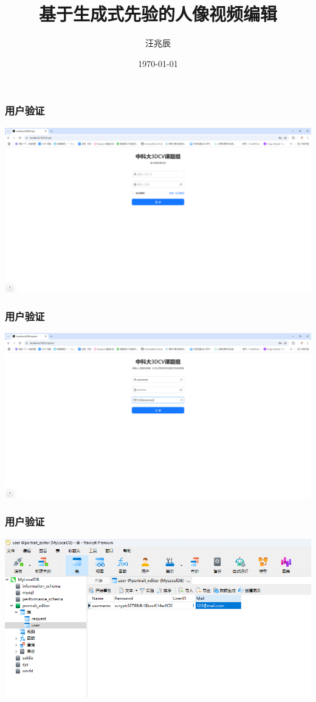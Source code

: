 \documentclass{beamer}
\title{基于生成式先验的人像视频编辑}
\author{汪兆辰}
\date{\ukdate\today}
\begin{document}
\begin{frame}
    \titlepage
\end{frame}

\begin{frame}
    \frametitle{用户验证}
    \includegraphics[width=\textwidth]{pic1.png}
\end{frame}

\begin{frame}
    \frametitle{用户验证}
    \includegraphics[width=\textwidth]{pic2.png}
\end{frame}

\begin{frame}
    \frametitle{用户验证}
    \includegraphics[width=\textwidth]{pic3.png}
\end{frame}
\end{document}
